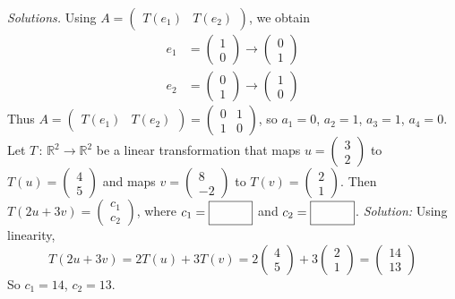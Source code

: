         \ifnum {} {\color{DarkBlue} \textit{Solutions.} 
            Using $A = \begin{pmatrix} T(e_1) & T(e_2) \end{pmatrix}$, we obtain
            \begin{align}
                e_1 &= \begin{pmatrix} 1\\0 \end{pmatrix} \to \begin{pmatrix}0\\1 \end{pmatrix} \\
                e_2 &= \begin{pmatrix} 0 \\1 \end{pmatrix} \to \begin{pmatrix} 1\\0 \end{pmatrix}
            \end{align}
            Thus $A = \begin{pmatrix} T(e_1) & T(e_2) \end{pmatrix} = \begin{pmatrix} 0 & 1\\1 & 0\end{pmatrix}$, so $a_1=0$, $a_2=1$, $a_3=1$, $a_4=0$. 
        } 
       \fi
\fi 
\ifnum {}
    Let $T \, : \, \mathbb R^2 \to \mathbb R^2$ be a linear transformation that maps
    $u = \begin{pmatrix} 3\\2 \end{pmatrix}$ to $T(u) = \begin{pmatrix} 4\\5\end{pmatrix}$ and maps $v = \begin{pmatrix}8\\-2 \end{pmatrix}$ to $T(v) = \begin{pmatrix} 2\\1\end{pmatrix}$. Then $T(2u+3v) = \begin{pmatrix} c_1\\c_2\end{pmatrix}$, where $c_1 = \framebox{\strut\hspace{1cm}}$ and $c_2 = \framebox{\strut\hspace{1cm}}$.  
    \ifnum {} {\color{DarkBlue} \textit{Solution:} Using linearity, $$T(2u+3v) = 2T(u) + 3T(v) = 2\begin{pmatrix} 4\\5\end{pmatrix} + 3\begin{pmatrix} 2\\1\end{pmatrix} = \begin{pmatrix} 14\\13\end{pmatrix}$$ So $c_1 = 14$, $c_2 = 13$.  } \fi    
